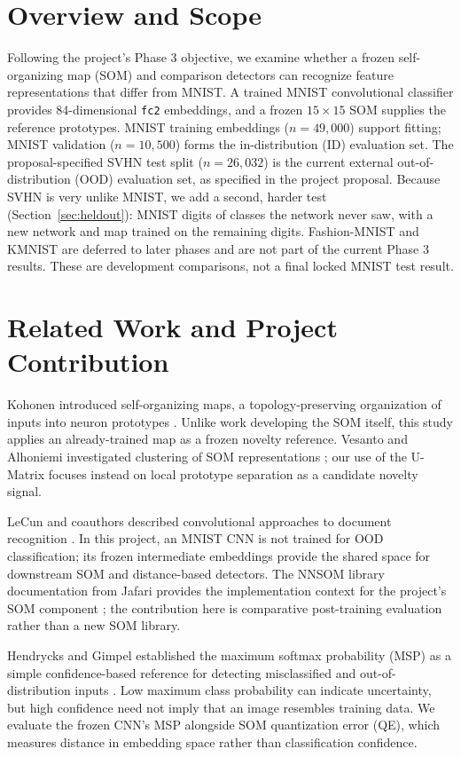 \documentclass[11pt]{article}
\begin{document}
\section{Overview and Scope}
Following the project's Phase 3 objective, we examine whether a frozen self-organizing map (SOM) and comparison detectors can recognize feature representations that differ from MNIST. A trained MNIST convolutional classifier provides 84-dimensional \texttt{fc2} embeddings, and a frozen $15\times15$ SOM supplies the reference prototypes. MNIST training embeddings ($n=49{,}000$) support fitting; MNIST validation ($n=10{,}500$) forms the in-distribution (ID) evaluation set. The proposal-specified SVHN \parencite{netzer2011reading} test split ($n=26{,}032$) is the current external out-of-distribution (OOD) evaluation set, as specified in the project proposal. Because SVHN is very unlike MNIST, we add a second, harder test (Section~\ref{sec:heldout}): MNIST digits of classes the network never saw, with a new network and map trained on the remaining digits. Fashion-MNIST and KMNIST are deferred to later phases and are not part of the current Phase 3 results. These are development comparisons, not a final locked MNIST test result.

\section{Related Work and Project Contribution}
Kohonen introduced self-organizing maps, a topology-preserving organization of inputs into neuron prototypes \parencite{kohonen1990som}. Unlike work developing the SOM itself, this study applies an already-trained map as a frozen novelty reference. Vesanto and Alhoniemi investigated clustering of SOM representations \parencite{vesanto2000clustering}; our use of the U-Matrix focuses instead on local prototype separation as a candidate novelty signal.

LeCun and coauthors described convolutional approaches to document recognition \parencite{lecun1998gradient}. In this project, an MNIST CNN is not trained for OOD classification; its frozen intermediate embeddings provide the shared space for downstream SOM and distance-based detectors. The NNSOM library documentation from Jafari provides the implementation context for the project's SOM component \parencite{jafari_nnsom}; the contribution here is comparative post-training evaluation rather than a new SOM library.

Hendrycks and Gimpel established the maximum softmax probability (MSP) as a simple confidence-based reference for detecting misclassified and out-of-distribution inputs \parencite{hendrycks2017baseline}. Low maximum class probability can indicate uncertainty, but high confidence need not imply that an image resembles training data. We evaluate the frozen CNN's MSP alongside SOM quantization error (QE), which measures distance in embedding space rather than classification confidence.
\end{document}
